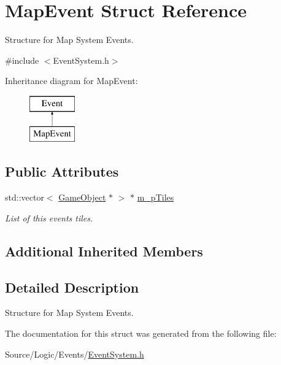 \hypertarget{struct_map_event}{}\section{Map\+Event Struct Reference}
\label{struct_map_event}


Structure for Map System Events.  




{\ttfamily \#include $<$Event\+System.\+h$>$}

Inheritance diagram for Map\+Event\+:\begin{figure}[H]
\begin{center}
\leavevmode
\includegraphics[height=2.000000cm]{struct_map_event}
\end{center}
\end{figure}
\subsection*{Public Attributes}
\begin{DoxyCompactItemize}
\item 
\mbox{\label{struct_map_event_a833078363434e917fad009481fd054c0}} 
std\+::vector$<$ \mbox{\hyperlink{class_game_object}{Game\+Object}} $\ast$ $>$ $\ast$ \mbox{\hyperlink{struct_map_event_a833078363434e917fad009481fd054c0}{m\+\_\+p\+Tiles}}
\begin{DoxyCompactList}\small\item\em List of this event\textquotesingle{}s tiles. \end{DoxyCompactList}\end{DoxyCompactItemize}
\subsection*{Additional Inherited Members}


\subsection{Detailed Description}
Structure for Map System Events. 

The documentation for this struct was generated from the following file\+:\begin{DoxyCompactItemize}
\item 
Source/\+Logic/\+Events/\mbox{\hyperlink{_event_system_8h}{Event\+System.\+h}}\end{DoxyCompactItemize}

